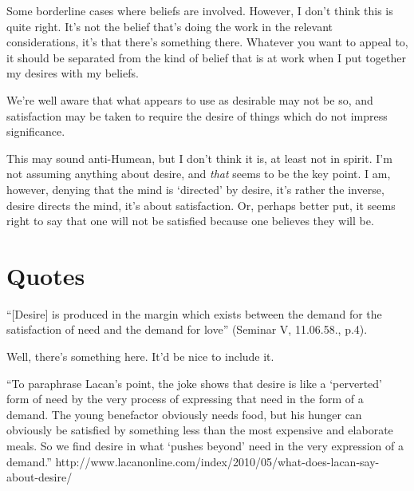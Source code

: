\documentclass[10pt]{article}
\begin{document}
Some borderline cases where beliefs are involved.
However, I don't think this is quite right.
It's not the belief that's doing the work in the relevant considerations, it's that there's something there.
Whatever you want to appeal to, it should be separated from the kind of belief that is at work when I put together my desires with my beliefs.

We're well aware that what appears to use as desirable may not be so, and satisfaction may be taken to require the desire of things which do not impress significance.

This may sound anti-Humean, but I don't think it is, at least not in spirit.
I'm not assuming anything about desire, and \emph{that} seems to be the key point.
I am, however, denying that the mind is `directed' by desire, it's rather the inverse, desire directs the mind, it's about satisfaction.
Or, perhaps better put, it seems right to say that one will not be satisfied because one believes they will be.


\section{Quotes}
\label{sec:quotes}

“[Desire] is produced in the margin which exists between the demand for the satisfaction of need and the demand for love” (Seminar V, 11.06.58., p.4).

Well, there's something here.
It'd be nice to include it.

``To paraphrase Lacan’s point, the joke shows that desire is like a ‘perverted’ form of need by the very process of expressing that need in the form of a demand. The young benefactor obviously needs food, but his hunger can obviously be satisfied by something less than the most expensive and elaborate meals. So we find desire in what ‘pushes beyond’ need in the very expression of a demand.''
http://www.lacanonline.com/index/2010/05/what-does-lacan-say-about-desire/







\nocite{Kaplan:1989aa,Smith:2004aa,Bratman:2003aa,Bratman:1981aa,Chislenko:2016aaMcDaniel:2008aa,Nottelmann:2011aa,Perry:1993aa,Rescher:1960aa,Schapiro:2014aa,Schroeder:2006aa,Schroeder:2007aa,Schroeder:2017aa,Sinhababu:2013aa,Sinhababu:2017aa,Velleman:2000aa,Velleman:2007aa}




\newpage
\printbibliography
\end{document}
